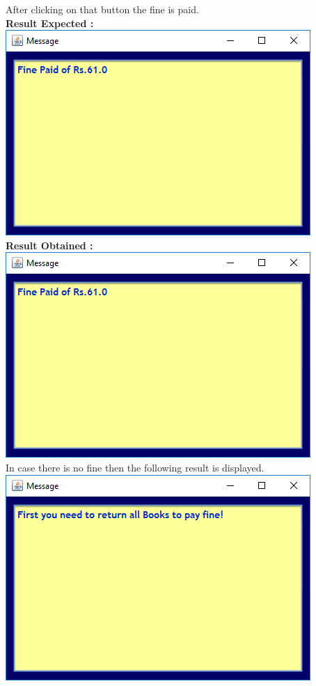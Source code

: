 \documentclass{article}
\begin{document}
\begin{enumerate}
	After clicking on that button the fine is paid.\\
	
	\textbf{Result Expected :}\\
	\includegraphics[scale=0.8]{images/UserLogin/Actions/PayFineSucessful.PNG}\\
	\textbf{Result Obtained :}\\
	\includegraphics[scale=0.8]{images/UserLogin/Actions/PayFineSucessful.PNG}\\
	
	
	In case there is no fine then the following result is displayed.\\
	\includegraphics[scale=0.8]{images/UserLogin/Actions/PayFineError.PNG}\\
	

\end{enumerate}
\end{document}
